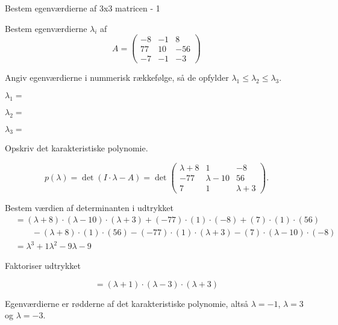 \documentclass{article}
\begin{document}
\tableofcontents
\newpage

\begin{exercise}{Bestem egenværdierne af 3x3 matricen - 1}

Bestem egenværdierne $\lambda_i$ af 
\[
A=\begin{pmatrix}
-8 & -1 & 8 \\
77 & 10 & -56 \\
-7 & -1 & -3
\end{pmatrix}
\]

Angiv egenværdierne i nummerisk rækkefølge, så de
opfylder $\lambda_1 \le \lambda_2 \le \lambda_3$.

$\lambda_1 = $ 

$\lambda_2 = $ 

$\lambda_3 = $ 

\hint
Opskriv det karakteristiske polynomie.

\hint
\[
p(\lambda)=\det\left(I \cdot \lambda - A \right)=\det\begin{pmatrix}
\lambda + 8  & 1 & -8 \\
-77 & \lambda - 10 & 56 \\
7 & 1 & \lambda + 3
\end{pmatrix}.
\]

\hint
Bestem værdien af determinanten i udtrykket
\begin{align*}
&=(\lambda+8) \cdot (\lambda-10) \cdot (\lambda+3)+(-77) \cdot (1) \cdot (-8)+(7) \cdot (1) \cdot (56) \\
& \qquad -(\lambda+8) \cdot (1) \cdot (56)-(-77) \cdot (1) \cdot (\lambda+3)-(7) \cdot (\lambda-10) \cdot (-8) \\
&=\lambda^3+1\lambda^2-9\lambda-9
\end{align*}

\hint
Faktoriser udtrykket

\hint
\[
=(\lambda+1) \cdot (\lambda-3) \cdot (\lambda+3)
\]

\hint
Egenværdierne er rødderne af det karakteristiske polynomie, 
altså
$\lambda=-1$, $\lambda=3$ og $\lambda=-3$.

\end{exercise}
\end{document}
